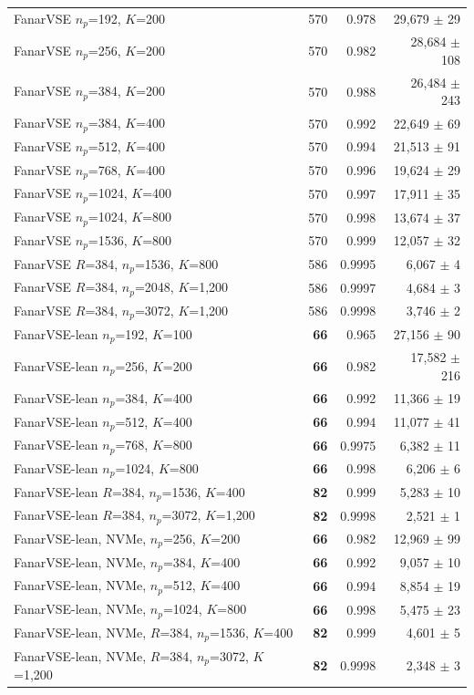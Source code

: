 \documentclass[fleqn,10pt]{wlscirep}
\begin{document}
\begin{table}[!htbp]
\begin{tabular}{lrrr}
FanarVSE $n_p$=192, $K$=200 & 570 & 0.978 & 29{,}679 $\pm$ 29 \\
FanarVSE $n_p$=256, $K$=200 & 570 & 0.982 & 28{,}684 $\pm$ 108 \\
FanarVSE $n_p$=384, $K$=200 & 570 & 0.988 & 26{,}484 $\pm$ 243 \\
FanarVSE $n_p$=384, $K$=400 & 570 & 0.992 & 22{,}649 $\pm$ 69 \\
FanarVSE $n_p$=512, $K$=400 & 570 & 0.994 & 21{,}513 $\pm$ 91 \\
FanarVSE $n_p$=768, $K$=400 & 570 & 0.996 & 19{,}624 $\pm$ 29 \\
FanarVSE $n_p$=1024, $K$=400 & 570 & 0.997 & 17{,}911 $\pm$ 35 \\
FanarVSE $n_p$=1024, $K$=800 & 570 & 0.998 & 13{,}674 $\pm$ 37 \\
FanarVSE $n_p$=1536, $K$=800 & 570 & 0.999 & 12{,}057 $\pm$ 32 \\
FanarVSE $R$=384, $n_p$=1536, $K$=800 & 586 & 0.9995 & 6{,}067 $\pm$ 4 \\
FanarVSE $R$=384, $n_p$=2048, $K$=1{,}200 & 586 & 0.9997 & 4{,}684 $\pm$ 3 \\
FanarVSE $R$=384, $n_p$=3072, $K$=1{,}200 & 586 & 0.9998 & 3{,}746 $\pm$ 2 \\
\midrule
FanarVSE-lean $n_p$=192, $K$=100 & \textbf{66} & 0.965 & 27{,}156 $\pm$ 90 \\
FanarVSE-lean $n_p$=256, $K$=200 & \textbf{66} & 0.982 & 17{,}582 $\pm$ 216 \\
FanarVSE-lean $n_p$=384, $K$=400 & \textbf{66} & 0.992 & 11{,}366 $\pm$ 19 \\
FanarVSE-lean $n_p$=512, $K$=400 & \textbf{66} & 0.994 & 11{,}077 $\pm$ 41 \\
FanarVSE-lean $n_p$=768, $K$=800 & \textbf{66} & 0.9975 & 6{,}382 $\pm$ 11 \\
FanarVSE-lean $n_p$=1024, $K$=800 & \textbf{66} & 0.998 & 6{,}206 $\pm$ 6 \\
FanarVSE-lean $R$=384, $n_p$=1536, $K$=400 & \textbf{82} & 0.999 & 5{,}283 $\pm$ 10 \\
FanarVSE-lean $R$=384, $n_p$=3072, $K$=1{,}200 & \textbf{82} & 0.9998 & 2{,}521 $\pm$ 1 \\
FanarVSE-lean, NVMe, $n_p$=256, $K$=200 & \textbf{66} & 0.982 & 12{,}969 $\pm$ 99 \\
FanarVSE-lean, NVMe, $n_p$=384, $K$=400 & \textbf{66} & 0.992 & 9{,}057 $\pm$ 10 \\
FanarVSE-lean, NVMe, $n_p$=512, $K$=400 & \textbf{66} & 0.994 & 8{,}854 $\pm$ 19 \\
FanarVSE-lean, NVMe, $n_p$=1024, $K$=800 & \textbf{66} & 0.998 & 5{,}475 $\pm$ 23 \\
FanarVSE-lean, NVMe, $R$=384, $n_p$=1536, $K$=400 & \textbf{82} & 0.999 & 4{,}601 $\pm$ 5 \\
FanarVSE-lean, NVMe, $R$=384, $n_p$=3072, $K$=1{,}200 & \textbf{82} & 0.9998 & 2{,}348 $\pm$ 3 \\
\bottomrule
\end{tabular}
\end{table}
\end{document}
